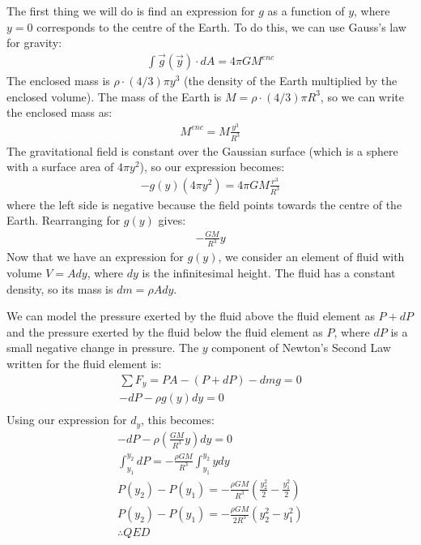 \begin{solution}
	The first thing we will do is find an expression for $g$ as a function of $y$, where $y=0$ corresponds to the centre of the Earth.  To do this, we can use Gauss's law for gravity:
	\begin{align*}
	\int \vec g(\vec y)\cdot dA=4\pi GM^{enc}
	\end{align*}
	The enclosed mass is $\rho\cdot (4/3)\pi y^3$ (the density of the Earth multiplied by the enclosed volume). The mass of the Earth is $M=\rho\cdot (4/3)\pi R^3$, so we can write the enclosed mass as:
	\begin{align*}
	M^{enc}=M\frac{y^3}{R^3}
	\end{align*}
	The gravitational field is constant over the Gaussian surface (which is a sphere with a surface area of $4\pi y^2$), so our expression becomes:
	\begin{align*}
	-g(y)(4\pi y^2)=4\pi GM\frac{r^3}{R^3}
	\end{align*}
	where the left side is negative because the field points towards the centre of the Earth. Rearranging for $g(y)$ gives:
	\begin{align*}
	-\frac{GM}{R^3}y
	\end{align*}
	Now that we have an expression for $g(y)$, we consider an element of fluid with volume $V=Ady$, where $dy$ is the infinitesimal height. The fluid has a constant density, so its mass is $dm=\rho Ady$.
	
	We can model the pressure exerted by the fluid above the fluid element as $P+dP$ and the pressure exerted by the fluid below the fluid element as $P$, where $dP$ is a small negative change in pressure. The $y$ component of Newton's Second Law written for the fluid element is:
	\begin{align*}
	\sum F_y=PA-(P+dP)-dmg=0\\
	-dP-\rho g(y)dy=0\\
	\end{align*}
	Using our expression for $d_y$, this becomes:
	\begin{align*}
	-dP-\rho\left( \frac{GM}{R^3}y\right)dy=0\\
	\int_{y_1}^{y_2}dP=-\frac{\rho GM}{R^3}\int_{y_1}^{y_2}ydy\\
	P(y_2)-P(y_1)=-\frac{\rho GM}{R^3}\left(\frac{y_2^2}{2}-\frac{y_1^2}{2}\right)\\
	P(y_2)-P(y_1)=-\frac{\rho GM}{2R^3}(y_2^2-y_1^2)\\
	\therefore QED
	\end{align*}
\end{solution}



